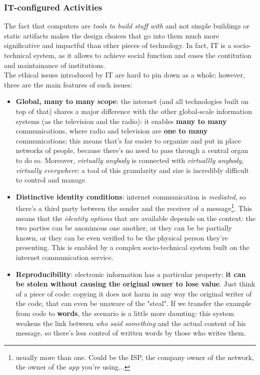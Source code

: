 \documentclass{article}
\begin{document}
			\subsubsection{IT-configured Activities}
				The fact that computers are \textit{tools to build stuff with} and not simple buildings or static artifacts makes the design choices that go into them much more significative and impactful than other pieces of technology. In fact, IT is a socio-technical system, as it allows to achieve social function and eases the contitution and maintainance of institutions.\\
				The ethical issues introduced by IT are hard to pin down as a whole; however, three are the main features of such issues:
				\begin{itemize}
					\item \textbf{Global, many to many scope}: the internet (and all technologies built on top of that) shares a major difference with the other global-scale information systems (as the television and the radio): it enables \textbf{many to many} communications, where radio and television are \textbf{one to many} communications; this means that's far easier to organize and put in place networks of people, because there's no need to pass through a central organ to do so. Moreover, \textit{virtually anybody} is connected with \textit{virtuallly anybody, virtually everywhere}: a tool of this granularity and size is incredibly difficult to control and manage.
					\item \textbf{Distinctive identity conditions}: internet communication is \textit{mediated}, so there's a third party between the sender and the receiver of a message\footnote{usually more than one. Could be the ISP, the company owner of the network, the owner of the \textit{app} you're using...}. This means that the \textit{identity options} that are available depends on the context: the two parties can be anonimous one another, or they can be be partially known, or they can be even verified to be the physical person they're presenting. This is enabled by a complex socio-technical system built on the internet communication service.
					\item \textbf{Reproducibility}: electronic information has a particular property: \textbf{it can be stolen without causing the original owner to lose value}. Just think of a piece of code: copying it does not harm in any way the original writer of the code, that can even be unaware of the "steal". If we transfer the example from code to \textbf{words}, the scenario is a little more daunting: this system weakens the link between \textit{who said something} and the actual content of his message, so there's less control of written words by those who writes them.
				\end{itemize}
\end{document}
